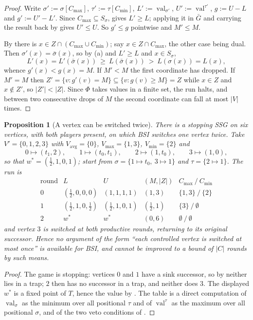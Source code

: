 \documentclass[11pt]{article}
\theoremstyle{plain}
\newtheorem{proposition}[theorem]{Proposition}
\theoremstyle{definition}
\DeclareMathOperator{\val}{val}
\newcommand{\Vmax}{V_{\max}}
\newcommand{\Vmin}{V_{\min}}
\newcommand{\Vavg}{V_{\mathrm{avg}}}
\begin{document}
\begin{proof}
Write $\sigma':=\sigma[C_{\max}]$, $\tau':=\tau[C_{\min}]$, $L':=\val_{\sigma'}$,
$U':=\val^{\tau'}$, $g:=U-L$ and $g':=U'-L'$. Since $C_{\max}\subseteq S_\sigma$,
 gives $L'\ge L$; applying it in $\bar G$ and carrying the
result back by  gives $U'\le U$. So $g'\le g$ pointwise
and $M'\le M$.

By  there is $x\in Z\cap(C_{\max}\cup C_{\min})$; say
$x\in Z\cap C_{\max}$, the other case being dual. Then
$\sigma'(x)=\bar\sigma(x)$, so by (a) and $L'\ge L$
and $x\in S_\sigma$,
\[
  L'(x)=L'(\bar\sigma(x))\ \ge\ L(\bar\sigma(x))\ >\ L(\sigma(x))=L(x),
\]
whence $g'(x)<g(x)=M$. If $M'<M$ the first coordinate has dropped. If
$M'=M$ then $Z'=\{v:g'(v)=M\}\subseteq\{v:g(v)\ge M\}=Z$ while $x\in Z$
and $x\notin Z'$, so $|Z'|<|Z|$. Since $\Phi$ takes values in a finite
set, the run halts, and between two consecutive drops of $M$ the second
coordinate can fall at most $|V|$ times.
\end{proof}

\begin{proposition}[A vertex can be switched twice]\label{prop:bsi-twice}
There is a stopping SSG on six vertices, with both players present, on
which BSI switches one vertex twice. Take $V'=\{0,1,2,3\}$ with
$\Vavg=\{0\}$, $\Vmax=\{1,3\}$, $\Vmin=\{2\}$ and
\[
  0\mapsto(t_1,2),\qquad 1\mapsto(t_0,t_1),\qquad
  2\mapsto(1,t_0),\qquad 3\mapsto(1,0),
\]
so that $w^\ast=(\tfrac12,1,0,1)$; start from
$\sigma=\{1\mapsto t_0,\ 3\mapsto1\}$ and $\tau=\{2\mapsto1\}$. The run is
\[
\begin{array}{c|cccc}
 \text{round} & L & U & (M,|Z|) & C_{\max}\ /\ C_{\min}\\\hline
 0 & (\tfrac12,0,0,0) & (1,1,1,1) & (1,3) & \{1,3\}\ /\ \{2\}\\
 1 & (\tfrac12,1,0,\tfrac12) & (\tfrac12,1,0,1) & (\tfrac12,1) & \{3\}\ /\ \emptyset\\
 2 & w^\ast & w^\ast & (0,6) & \emptyset\ /\ \emptyset
\end{array}
\]
and vertex $3$ is switched at both productive rounds, returning to its
original successor. Hence no argument of the form ``each controlled vertex
is switched at most once'' is available for BSI, and 
cannot be improved to a bound of $|C|$ rounds by such means.
\end{proposition}

\begin{proof}
The game is stopping: vertices $0$ and $1$ have a sink successor, so by
 neither lies in a trap; $2$ then has no successor in a
trap, and neither does $3$. The displayed $w^\ast$ is a fixed point of
$T$, hence the value by . The table is a direct
computation of $\val_\sigma$ as the minimum over all positional $\tau$ and
of $\val^\tau$ as the maximum over all positional $\sigma$, and of the two
veto conditions of .
\end{proof}
\end{document}
